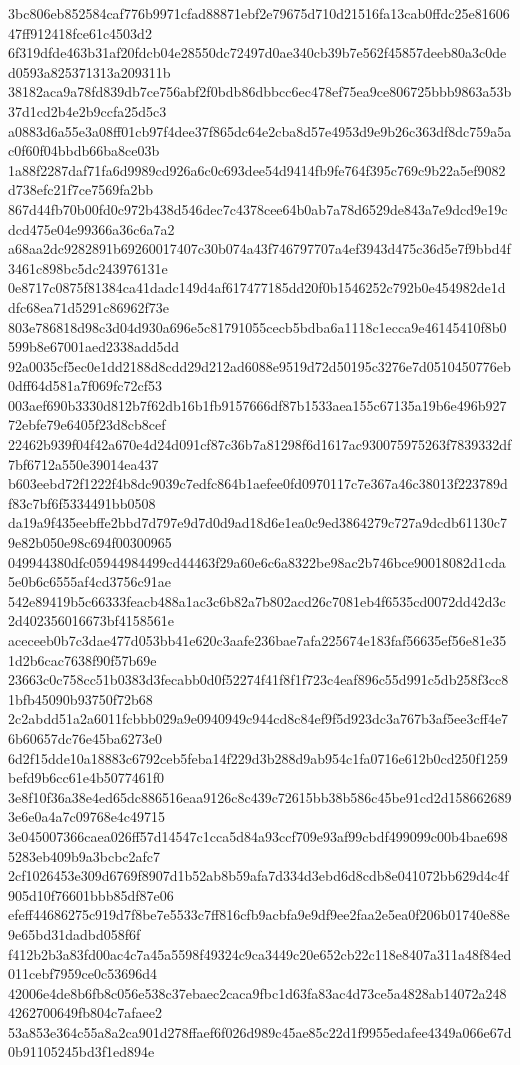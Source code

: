 {3bc806eb852584caf776b9971cfad88871ebf2e79675d710d21516fa13cab0ffdc25e8160647ff912418fce61c4503d2
6f319dfde463b31af20fdcb04e28550dc72497d0ae340cb39b7e562f45857deeb80a3c0ded0593a825371313a209311b
38182aca9a78fd839db7ce756abf2f0bdb86dbbcc6ec478ef75ea9ce806725bbb9863a53b37d1cd2b4e2b9ccfa25d5c3
a0883d6a55e3a08ff01cb97f4dee37f865dc64e2cba8d57e4953d9e9b26c363df8dc759a5ac0f60f04bbdb66ba8ce03b
1a88f2287daf71fa6d9989cd926a6c0c693dee54d9414fb9fe764f395c769c9b22a5ef9082d738efc21f7ce7569fa2bb
867d44fb70b00fd0c972b438d546dec7c4378cee64b0ab7a78d6529de843a7e9dcd9e19cdcd475e04e99366a36c6a7a2
a68aa2dc9282891b69260017407c30b074a43f746797707a4ef3943d475c36d5e7f9bbd4f3461c898bc5dc243976131e
0e8717c0875f81384ca41dadc149d4af617477185dd20f0b1546252c792b0e454982de1ddfc68ea71d5291c86962f73e
803e786818d98c3d04d930a696e5c81791055cecb5bdba6a1118c1ecca9e46145410f8b0599b8e67001aed2338add5dd
92a0035cf5ec0e1dd2188d8cdd29d212ad6088e9519d72d50195c3276e7d0510450776eb0dff64d581a7f069fc72cf53
003aef690b3330d812b7f62db16b1fb9157666df87b1533aea155c67135a19b6e496b92772ebfe79e6405f23d8cb8cef
22462b939f04f42a670e4d24d091cf87c36b7a81298f6d1617ac930075975263f7839332df7bf6712a550e39014ea437
b603eebd72f1222f4b8dc9039c7edfc864b1aefee0fd0970117c7e367a46c38013f223789df83c7bf6f5334491bb0508
da19a9f435eebffe2bbd7d797e9d7d0d9ad18d6e1ea0c9ed3864279c727a9dcdb61130c79e82b050e98c694f00300965
049944380dfc05944984499cd44463f29a60e6c6a8322be98ac2b746bce90018082d1cda5e0b6c6555af4cd3756c91ae
542e89419b5c66333feacb488a1ac3c6b82a7b802acd26c7081eb4f6535cd0072dd42d3c2d402356016673bf4158561e
aceceeb0b7c3dae477d053bb41e620c3aafe236bae7afa225674e183faf56635ef56e81e351d2b6cac7638f90f57b69e
23663c0c758cc51b0383d3fecabb0d0f52274f41f8f1f723c4eaf896c55d991c5db258f3cc81bfb45090b93750f72b68
2c2abdd51a2a6011fcbbb029a9e0940949c944cd8c84ef9f5d923dc3a767b3af5ee3cff4e76b60657dc76e45ba6273e0
6d2f15dde10a18883c6792ceb5feba14f229d3b288d9ab954c1fa0716e612b0cd250f1259befd9b6cc61e4b5077461f0
3e8f10f36a38e4ed65dc886516eaa9126c8c439c72615bb38b586c45be91cd2d1586626893e6e0a4a7c09768e4c49715
3e045007366caea026ff57d14547c1cca5d84a93ccf709e93af99cbdf499099c00b4bae6985283eb409b9a3bcbc2afc7
2cf1026453e309d6769f8907d1b52ab8b59afa7d334d3ebd6d8cdb8e041072bb629d4c4f905d10f76601bbb85df87e06
efeff44686275c919d7f8be7e5533c7ff816cfb9acbfa9e9df9ee2faa2e5ea0f206b01740e88e9e65bd31dadbd058f6f
f412b2b3a83fd00ac4c7a45a5598f49324c9ca3449c20e652cb22c118e8407a311a48f84ed011cebf7959ce0c53696d4
42006e4de8b6fb8c056e538c37ebaec2caca9fbc1d63fa83ac4d73ce5a4828ab14072a2484262700649fb804c7afaee2
53a853e364c55a8a2ca901d278ffaef6f026d989c45ae85c22d1f9955edafee4349a066e67d0b91105245bd3f1ed894e
}
